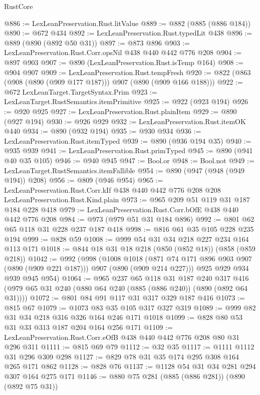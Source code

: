\begin{lexlean}{RustCore}
\begin{coremodule}
@886 := LexLeanPreservation.Rust.litValue
@889 := @882 (@885 (@886 @184))
@890 := @672 @434
@892 := LexLeanPreservation.Rust.typedLit @438
@896 := @889 (@890 (@892 @50 @31))
@897 := @873 @896
@903 := LexLeanPreservation.Rust.Corr.opsNil @438 @440 @442 @776 @208
@904 := @897 @903
@907 := @890 (LexLeanPreservation.Rust.isTemp @164)
@908 := @904 @907
@909 := LexLeanPreservation.Rust.tempFresh
@920 := @822 (@863 (@908 (@890 (@909 @177 @187))) @907 (@890 (@909 @166 @188)))
@922 := @672 LexLeanTarget.TargetSyntax.Prim
@923 := LexLeanTarget.RustSemantics.itemPrimitive
@925 := @922 (@923 @194)
@926 := @920 @925
@927 := LexLeanPreservation.Rust.plainItem
@929 := @890 (@927 @194)
@930 := @926 @929
@932 := LexLeanPreservation.Rust.itemOK @440
@934 := @890 (@932 @194)
@935 := @930 @934
@936 := LexLeanPreservation.Rust.itemTyped
@939 := @890 (@936 @194 @35)
@940 := @935 @939
@941 := LexLeanPreservation.Rust.primTyped
@945 := @890 (@941 @40 @35 @105)
@946 := @940 @945
@947 := Bool.or
@948 := Bool.not
@949 := LexLeanTarget.RustSemantics.itemFallible
@954 := @890 (@947 (@948 (@949 @194)) @208)
@956 := @809 (@946 @954)
@965 := LexLeanPreservation.Rust.Corr.kIf
    @438
    @440
    @442
    @776
    @208
    @208
    LexLeanPreservation.Rust.Kind.plain
@973 := @965 @209 @51 @119 @31 @187 @184 @228 @418
@979 := LexLeanPreservation.Rust.Corr.bOfE @438 @440 @442 @776 @208
@984 := @973 (@979 @51 @31 @184 @896)
@992 := @801 @62 @65 @118 @31 @228 @237 @187 @418
@998 := @816 @61 @35 @105 @228 @235 @194
@999 := @828 @59
@1008 := @999 @54 @31 @34 @218 @227 @234 @164 @113 @171
@1018 := @844 @18 @31 @18 @218 (@850 (@852 @18)) (@858 (@859 @218))
@1042 := @992
    (@998
      (@1008
        @1018
        (@871 @74 @171 @896 @903 @907 (@890 (@909 @221 @187)))
        @907
        (@890 (@909 @214 @227)))
      @925
      @929
      @934
      @939
      @945
      @954)
@1064 := @965
    @237
    @65
    @118
    @31
    @187
    @240
    @317
    @416
    (@979 @65 @31 @240 (@880 @64 @240 (@885 (@886 @240)) (@890 (@892 @64 @31))))
@1072 := @801 @84 @91 @117 @31 @317 @329 @187 @416
@1073 := @815 @67
@1079 := @1073 @83 @35 @105 @317 @327 @319
@1089 := @999 @82 @31 @34 @218 @316 @326 @164 @246 @171 @1018
@1099 := @828 @80 @53 @31 @33 @313 @187 @204 @164 @256 @171
@1109 := LexLeanPreservation.Rust.Corr.eOfB @438 @440 @442 @776 @208 @80 @31 @296 @311
@1111 := @815 @69 @79
@1112 := @32 @35
@1117 := @1111 @1112 @31 @296 @309 @298
@1127 := @829 @78 @31 @35 @174 @295 @308 @164 @265 @171 @862
@1128 := @828 @76
@1137 := @1128 @54 @31 @34 @281 @294 @307 @164 @275 @171
@1146 := @880 @75 @281 (@885 (@886 @281)) (@890 (@892 @75 @31))

\end{coremodule}
\end{lexlean}
